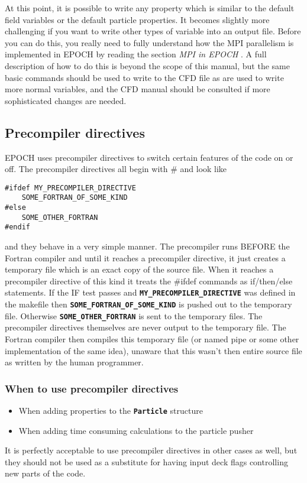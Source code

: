 \documentclass[12pt]{article}
\newcommand{\simpleboxverbatim}{\begin{Verbatim}[obeytabs=true,frame=single,
  framerule=0.5mm,rulecolor=\color{warwickmid}]}
\newcommand{\inlinecode}[1]{{\color{warwickred} \bf\texttt{#1}}}
\newcommand{\nEPOCH}{{\color{warwickdark}\fontfamily{phv}\selectfont EPOCH}}
\newcommand{\EPOCH}{{\nEPOCH} }
\begin{document}
At this point, it is possible to write any property which is similar to the
default field variables or the default particle properties. It becomes slightly
more challenging if you want to write other types of variable into an output
file. Before you can do this, you really need to fully understand how the MPI
parallelism is implemented in \EPOCH by reading the section {\it MPI in
\EPOCH}. A full description of how to do this is beyond the scope of this
manual, but the same basic commands should be used to write to the CFD file as
are used to write more normal variables, and the CFD manual should be consulted
if more sophisticated changes are needed.

\pagebreak

\subsection{Precompiler directives}
\EPOCH uses precompiler directives to switch certain features of the code on or
off. The precompiler directives all begin with \# and look like
\simpleboxverbatim
#ifdef MY_PRECOMPILER_DIRECTIVE
	SOME_FORTRAN_OF_SOME_KIND
#else
	SOME_OTHER_FORTRAN
#endif
\end{Verbatim}
and they behave in a very simple manner. The precompiler runs BEFORE the
Fortran compiler and until it reaches a precompiler directive, it just creates
a temporary file which is an exact copy of the source file. When it reaches a
precompiler directive of this kind it treats the \#ifdef commands as
if/then/else statements. If the IF test passes and
\inlinecode{MY\_PRECOMPILER\_DIRECTIVE} was defined in the makefile then
\inlinecode{SOME\_FORTRAN\_OF\_SOME\_KIND} is pushed out to the temporary
file. Otherwise \inlinecode{SOME\_OTHER\_FORTRAN} is sent to the temporary
files. The precompiler directives themselves are never output to the temporary
file. The Fortran compiler then compiles this temporary file (or named pipe or
some other implementation of the same idea), unaware that this wasn't then
entire source file as written by the human programmer.

\subsubsection{When to use precompiler directives}
\begin{itemize}
\item When adding properties to the \inlinecode{Particle} structure
\item When adding time consuming calculations to the particle pusher
\end{itemize}
It is perfectly acceptable to use precompiler directives in other cases as
well, but they should not be used as a substitute for having input deck flags
controlling new parts of the code.
\end{document}
